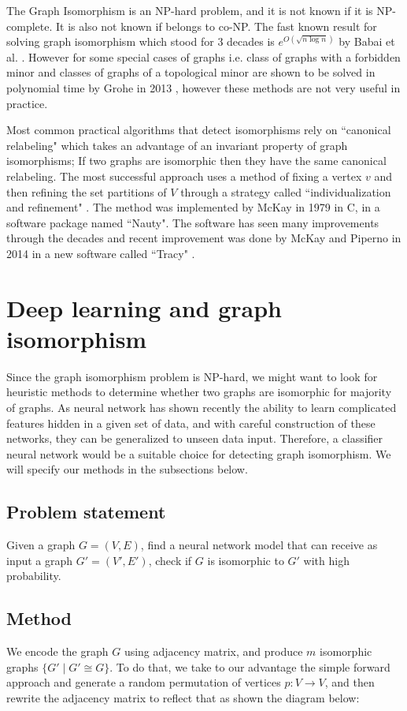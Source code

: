 \documentclass[letterpaper,UKenglish]{lipics-v2018}
\begin{document}
The Graph Isomorphism is an NP-hard problem, and it is not known if it is NP-complete. It is also not known if belongs to co-NP. The fast known result for solving graph isomorphism which stood for 3 decades is $e^{O(\sqrt{n \log n})}$ by Babai et al. \cite{BabaiL83}. However for some special cases of graphs i.e. class of graphs with a forbidden minor and classes of graphs of a topological minor are shown to be solved in polynomial time by Grohe in 2013 \cite{Grohe13}, however these methods are not very useful in practice.

Most common practical algorithms that detect isomorphisms rely on ``canonical relabeling" which takes an advantage of an invariant property of graph isomorphisms; If two graphs are isomorphic then they have the same canonical relabeling. The most successful approach uses a method of fixing a vertex $v$ and then refining the set partitions of $V$ through a strategy called ``individualization and refinement" \cite{parris1969coding}. The method was implemented by McKay in 1979 in C, in a software package named ``Nauty". The software has seen many improvements through the decades and recent improvement was done by 
McKay and Piperno in 2014 in a new software called ``Tracy" \cite{mckay2014practical}.

\section{Deep learning and graph isomorphism}
Since the graph isomorphism problem is NP-hard, we might want to look for heuristic methods to determine whether two graphs are isomorphic for majority of graphs. As neural network has shown recently the ability to learn complicated features hidden in a given set of data, and with careful construction of these networks, they can be generalized to unseen data input. Therefore, a classifier neural network would be a suitable choice for detecting graph isomorphism. We will specify our methods in the subsections below.

\subsection{Problem statement}
Given a graph $G = (V,E)$, find a neural network model that can receive as input a graph $G' = (V',E')$, check if $G$ is isomorphic to $G'$ with high probability.  

\subsection{Method}
We encode the graph $G$ using adjacency matrix, and produce $m$ isomorphic graphs $\{ G' \mid G' \cong G \}$. To do that, we take to our advantage the simple forward approach and generate a random permutation of vertices $p \colon V\to V$, and then rewrite the adjacency matrix to reflect that as shown the diagram below:
\end{document}
